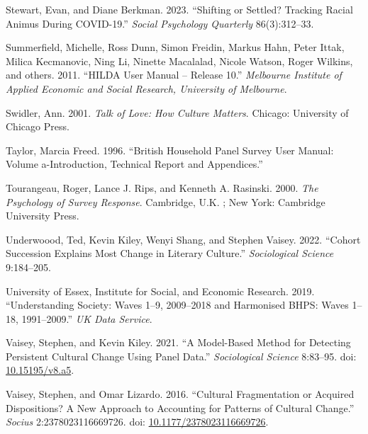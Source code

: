 \documentclass[
  12pt,
]{article}
\newlength{\cslhangindent}
\newlength{\cslentryspacingunit} %
\newenvironment{CSLReferences}[2] %
 {%
  \setlength{\parindent}{0pt}
  \ifodd #1
  \let\oldpar\par
  \def\par{\hangindent=\cslhangindent\oldpar}
  \fi
  \setlength{\parskip}{#2\cslentryspacingunit}
 }%
 {}
\begin{document}
\begin{CSLReferences}{1}{0}
\leavevmode{}%
Stewart, Evan, and Diane Berkman. 2023. {``Shifting or Settled? Tracking
Racial Animus During COVID-19.''} \emph{Social Psychology Quarterly}
86(3):312--33.

\leavevmode{}%
Summerfield, Michelle, Ross Dunn, Simon Freidin, Markus Hahn, Peter
Ittak, Milica Kecmanovic, Ning Li, Ninette Macalalad, Nicole Watson,
Roger Wilkins, and others. 2011. {``HILDA User Manual -- Release 10.''}
\emph{Melbourne Institute of Applied Economic and Social Research,
University of Melbourne}.

\leavevmode{}%
Swidler, Ann. 2001. \emph{Talk of {Love}: {How} {Culture} {Matters}}.
Chicago: University of Chicago Press.

\leavevmode{}%
Taylor, Marcia Freed. 1996. {``British Household Panel Survey User
Manual: Volume a-Introduction, Technical Report and Appendices.''}

\leavevmode{}%
Tourangeau, Roger, Lance J. Rips, and Kenneth A. Rasinski. 2000.
\emph{The Psychology of Survey Response}. Cambridge, U.K. ; New York:
Cambridge University Press.

\leavevmode{}%
Underwoood, Ted, Kevin Kiley, Wenyi Shang, and Stephen Vaisey. 2022.
{``Cohort Succession Explains Most Change in Literary Culture.''}
\emph{Sociological Science} 9:184--205.

\leavevmode{}%
University of Essex, Institute for Social, and Economic Research. 2019.
{``Understanding Society: Waves 1--9, 2009--2018 and Harmonised BHPS:
Waves 1--18, 1991--2009.''} \emph{UK Data Service}.

\leavevmode{}%
Vaisey, Stephen, and Kevin Kiley. 2021. {``A {Model}-{Based} {Method}
for {Detecting} {Persistent} {Cultural} {Change} {Using} {Panel}
{Data}.''} \emph{Sociological Science} 8:83--95. doi:
\href{https://doi.org/10.15195/v8.a5}{10.15195/v8.a5}.

\leavevmode{}%
Vaisey, Stephen, and Omar Lizardo. 2016. {``Cultural {Fragmentation} or
{Acquired} {Dispositions}? {A} {New} {Approach} to {Accounting} for
{Patterns} of {Cultural} {Change}.''} \emph{Socius} 2:2378023116669726.
doi:
\href{https://doi.org/10.1177/2378023116669726}{10.1177/2378023116669726}.


\end{CSLReferences}
\end{document}
